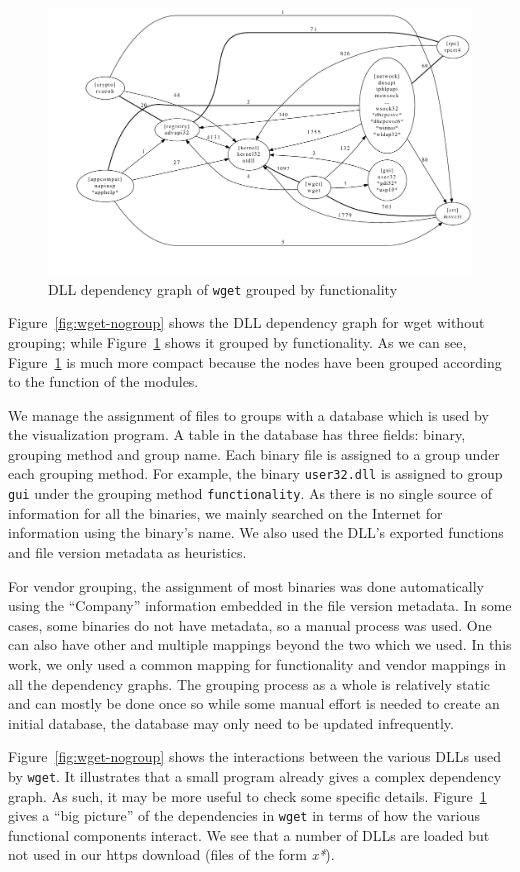 \begin{figure}[thb]
\centering
\includegraphics[width=1.0\columnwidth]{depvis/wget-function.pdf}
\caption{DLL dependency graph of {\tt wget} grouped by functionality}
\label{fig:wget-function}
\end{figure}

Figure~\ref{fig:wget-nogroup} shows the DLL
dependency graph for wget without grouping; while
Figure~\ref{fig:wget-function} shows it grouped by functionality.
As we can see, Figure~\ref{fig:wget-function} is much more compact
because the nodes have been grouped according to the function of the modules.

We manage the assignment of files to groups with a data\-base which is
used by the visualization program.
A table in the database has three fields: binary,
grouping method and group name.
Each binary file is assigned to a group under each grouping method.
For example, the binary {\tt user32.dll} is assigned to group {\tt gui} under
the grouping method {\tt functi\-onality}.
As there is no single source of information for all the binaries, we mainly
searched on the Internet for information using the binary's name.
We also used the DLL's exported functions and file version metadata
as heuristics.

For vendor grouping, the assignment of most binaries was done automatically
using the ``Company'' information embedded in the file version metadata.
In some cases, some binaries do not have metadata, so a manual process
was used.
One can also have other and multiple mappings beyond the two which we used.
In this work, we only used a
common mapping for functionality and vendor mappings
in all the dependency graphs.
The grouping process as a whole is relatively static and can mostly be
done once so while some manual effort is needed to create an initial
database, the database may only need to be updated infrequently.

Figure~\ref{fig:wget-nogroup} shows the interactions
between the various DLLs used by {\tt wget}.
It illustrates that a small program already
gives a complex dependency graph.
As such, it may be more useful to check some specific details.
Figure~\ref{fig:wget-function} gives
a ``big picture'' of the dependencies
in {\tt wget} in terms of how the various functional
components interact.
We see that a number of DLLs are loaded but not used in our https download
(files of the form {\it *x*}).

